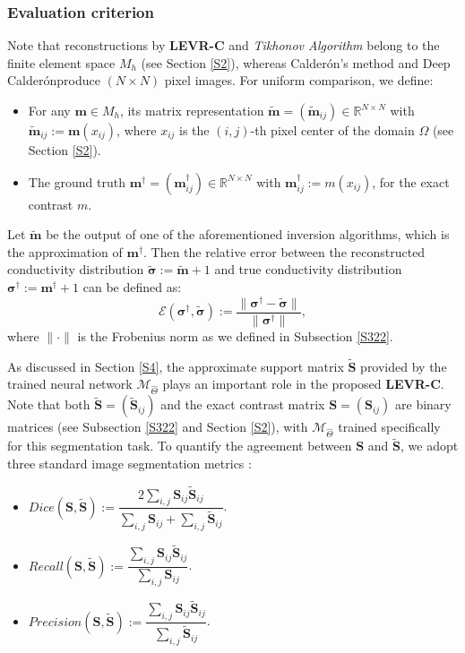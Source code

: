 \documentclass[11pt]{article}
\newcommand{\R}{{\mathbb R}}
\newcommand{\wit}{\widetilde}
\newcommand{\Calderon}{Calder\'{o}n}
\newcommand{\bds}[1]{\boldsymbol{#1}}
\begin{document}
\subsubsection{Evaluation criterion}\label{S514}

Note that reconstructions by \textbf{LEVR-C} and \textit{Tikhonov Algorithm} belong to the finite element space $ M_h $ (see Section \ref{S2}), whereas \Calderon's method and Deep \Calderon\;produce $ (N\times N) $ pixel images.
For uniform comparison, we define:
\begin{itemize}
\item For any $ \bds{m}\in M_h $, its matrix representation $ \wit{\bds{m}} = (\wit{\bds{m}}_{ij})\in \R^{N\times N} $ with $ \wit{\bds{m}}_{ij} := \bds{m}(x_{ij}) $, where $ x_{ij} $ is the $ (i,j) $-th pixel center of the domain $\Omega$ (see Section \ref{S2}).
\item The ground truth $ \bds{m}^\dagger = (\bds{m}^\dagger_{ij})\in \R^{N\times N} $ with $ \bds{m}^\dagger_{ij} := m(x_{ij}) $, for the exact contrast $ m $.
\end{itemize}
Let $ \wit{\bds{m}} $ be the output of one of the aforementioned inversion algorithms, which is the approximation of $ \bds{m}^\dagger $. 
Then the relative error between the reconstructed conductivity distribution $\wit{\bds{\sigma}} := \wit{\bds{m}} + 1 $ and true conductivity distribution $\bds{\sigma}^\dagger := \bds{m}^\dagger + 1 $ can be defined as:
\begin{equation}\label{64}
\mathcal{E}(\bds{\sigma}^\dagger, \wit{\bds{\sigma}}) := \dfrac{\|\bds{\sigma}^\dagger - \wit{\bds{\sigma}}\|}{\|\bds{\sigma}^\dagger\|},
\end{equation}
where $ \|\cdot\| $ is the Frobenius norm as we defined in Subsection \ref{S322}.

As discussed in Section \ref{S4}, the approximate support matrix $ \wit{\bds{S}} $ provided by the trained neural network $ \mathcal{M}_{\widehat{\Theta}} $ plays an important role in the proposed \textbf{LEVR-C}.
Note that both $ \wit{\bds{S}} = (\wit{\bds{S}}_{ij}) $ and the exact contrast matrix $ \bds{S} = (\bds{S}_{ij}) $ are binary matrices (see  Subsection \ref{S322} and Section \ref{S2}), with $ \mathcal{M}_{\widehat{\Theta}} $ trained specifically for this segmentation task.
To quantify the agreement between $ \bds{S} $ and $ \wit{\bds{S}} $, we adopt three standard image segmentation metrics \cite{WZW20}:
\begin{itemize}
\item $Dice(\bds{S}, \wit{\bds{S}}) := \dfrac{2\sum_{i,j}\bds{S}_{ij}\wit{\bds{S}}_{ij}}{\sum_{i,j}\bds{S}_{ij} + \sum_{i,j}\wit{\bds{S}}_{ij}}$.

\item $Recall(\bds{S}, \wit{\bds{S}}) := \dfrac{\sum_{i,j}\bds{S}_{ij}\wit{\bds{S}}_{ij}}{\sum_{i,j}\bds{S}_{ij}}$.

\item $Precision(\bds{S}, \wit{\bds{S}}) := \dfrac{\sum_{i,j}\bds{S}_{ij}\wit{\bds{S}}_{ij}}{\sum_{i,j}\wit{\bds{S}}_{ij}}$.
\end{itemize}
\end{document}
